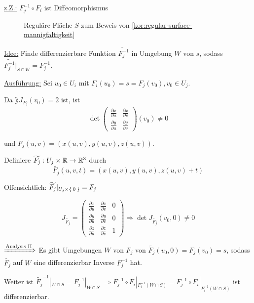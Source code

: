 \begin{beweis}
    \underline{z.Z.:} $F_j^{-1} \circ F_i$ ist Diffeomorphismus

    \begin{figure}[htp]
        \centering
        
        \caption{Reguläre Fläche $S$ zum Beweis von \cref{kor:regular-surface-mannigfaltigkeit}}
        \label{fig:parametric-surface-mapping}
    \end{figure}
    

    \underline{Idee:} Finde differenzierbare Funktion $\widetilde{F_j^{-1}}$
    in Umgebung $W$ von $s$, sodass $\widetilde{F_j^{-1}}|_{S \cap W} = F_j^{-1}$.

    \underline{Ausführung:} Sei $u_0 \in U_i$ mit $F_i(u_0) = s = F_j(v_0), v_0 \in U_j$.

    Da $\rang{J_{F_j}(v_0)} = 2$ ist, ist \obda 
    \[\det 
        \begin{pmatrix}
            \frac{\partial x}{\partial u} & \frac{\partial x}{\partial v}\\
            \frac{\partial y}{\partial u} & \frac{\partial y}{\partial v}
        \end{pmatrix} (v_0) \neq 0
    \]

    und $F_j(u,v) = \left ( x(u,v), y(u,v), z(u,v) \right)$.

    Definiere $\widetilde{F_j}: U_j \times \mathbb{R} \rightarrow \mathbb{R}^3$ durch
    \[\widetilde{F_j} (u, v, t) = \left(x(u,v), y(u,v), z(u,v)+t \right )\]
    
    Offensichtlich: $\widetilde{F_j} |_{U_j \times \Set{0}} = F_j$

    \[J_{\widetilde{F_j}} = 
    \begin{pmatrix}
        \frac{\partial x}{\partial u}   & \frac{\partial x}{\partial v} & 0\\
        \frac{\partial y}{\partial u}   & \frac{\partial y}{\partial v} & 0\\
        \frac{\partial z}{\partial u}   & \frac{\partial z}{\partial v} & 1
    \end{pmatrix} \Rightarrow \det J_{\widetilde{F_j}} (v_0, 0) \neq  0\]

    $\xRightarrow{\text{Analysis II}}$ Es gibt Umgebungen $W$ von
    $F_j$ von $\widetilde{F_j}(v_0, 0) = F_j(v_0) = s$, sodass $\widetilde{F_j}$
    auf $W$ eine differenzierbar Inverse $F_j^{-1}$ hat.

    Weiter ist $\widetilde{F_j}^{-1}|_{W \cap S} = F_j^{-1} |_{W \cap S}$
    $\Rightarrow F_j^{-1} \circ F_i |_{F_i^{-1} (W \cap S)} = F_j^{-1} \circ F_i |_{F_i^{-1} (W \cap S)}$
    ist differenzierbar.
\end{beweis}

